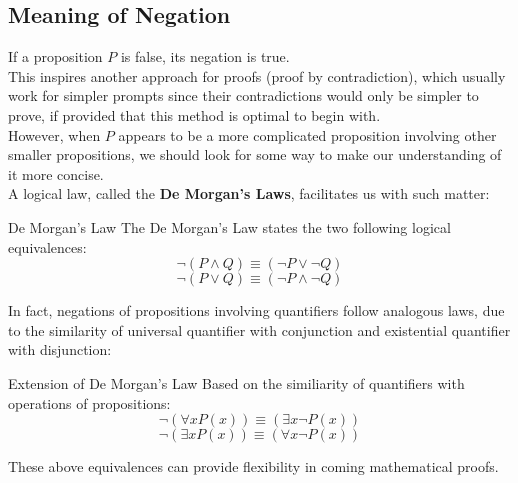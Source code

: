 \subsection{Meaning of Negation}
If a proposition $P$ is false, its negation is true. \\
This inspires another approach for proofs (proof by contradiction), which usually work for simpler prompts since their contradictions would only be simpler to prove, if provided that this method is optimal to begin with. \\
However, when $P$ appears to be a more complicated proposition involving other smaller propositions, we should look for some way to make our understanding of it more concise. \\
A logical law, called the \textbf{De Morgan's Laws}, facilitates us with such matter:
\begin{ln-axiom}{De Morgan's Law}{}
    The De Morgan's Law states the two following logical equivalences:
    \[\neg (P \land Q) \equiv (\neg P \lor \neg Q)\]
    \[\neg (P \lor Q) \equiv (\neg P \land \neg Q)\]
\end{ln-axiom}
In fact, negations of propositions involving quantifiers follow analogous laws, due to the similarity of universal quantifier with conjunction and existential quantifier with disjunction:
\begin{ln-axiom}{Extension of De Morgan's Law}{}
    Based on the similiarity of quantifiers with operations of propositions:
    \[\neg (\forall x P(x)) \equiv (\exists x \neg P(x))\]
    \[\neg (\exists x P(x)) \equiv (\forall x \neg P(x))\]
\end{ln-axiom}
These above equivalences can provide flexibility in coming mathematical proofs.

